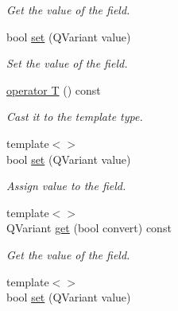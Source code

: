 \begin{DoxyCompactItemize}
\begin{DoxyCompactList}\small\item\em Get the value of the field. \item\end{DoxyCompactList}\item 
\hypertarget{classDQField_a6d53fed742befb445301aa5b99b45489}{
bool \hyperlink{classDQField_a6d53fed742befb445301aa5b99b45489}{set} (QVariant value)}
\label{classDQField_a6d53fed742befb445301aa5b99b45489}

\begin{DoxyCompactList}\small\item\em Set the value of the field. \item\end{DoxyCompactList}\item 
\hypertarget{classDQField_a619e96cbcecea1545b9ff9c70f08a4a9}{
\hyperlink{classDQField_a619e96cbcecea1545b9ff9c70f08a4a9}{operator T} () const }
\label{classDQField_a619e96cbcecea1545b9ff9c70f08a4a9}

\begin{DoxyCompactList}\small\item\em Cast it to the template type. \item\end{DoxyCompactList}\item 
\hypertarget{classDQField_a0a680cdf8892cf2a408109cd26787f6f}{
{\footnotesize template$<$$>$ }\\bool \hyperlink{classDQField_a0a680cdf8892cf2a408109cd26787f6f}{set} (QVariant value)}
\label{classDQField_a0a680cdf8892cf2a408109cd26787f6f}

\begin{DoxyCompactList}\small\item\em Assign value to the field. \item\end{DoxyCompactList}\item 
{\footnotesize template$<$$>$ }\\QVariant \hyperlink{classDQField_a7eb8d6686283fca855c3344b9ad77f36}{get} (bool convert) const
\begin{DoxyCompactList}\small\item\em Get the value of the field. \item\end{DoxyCompactList}\item 
\hypertarget{classDQField_a0a680cdf8892cf2a408109cd26787f6f}{
{\footnotesize template$<$$>$ }\\bool \hyperlink{classDQField_a0a680cdf8892cf2a408109cd26787f6f}{set} (QVariant value)}
\label{classDQField_a0a680cdf8892cf2a408109cd26787f6f}


\end{DoxyCompactItemize}
